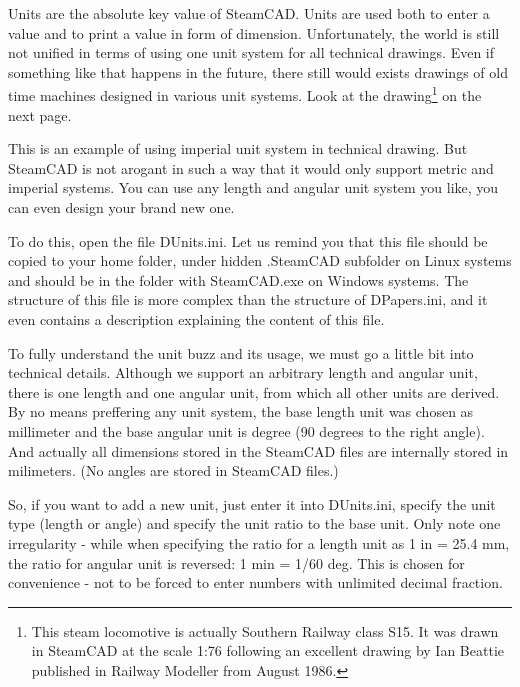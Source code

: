 Units are the absolute key value of SteamCAD. Units are used both to enter a value and
to print a value in form of dimension. Unfortunately, the world is still not unified
in terms of using one unit system for all technical drawings. Even if something like
that happens in the future, there still would exists drawings of old time machines
designed in various unit systems. Look at the drawing\footnote{This steam locomotive
is actually Southern Railway class S15. It was drawn in SteamCAD at the scale 1:76
following an excellent drawing by Ian Beattie published in Railway Modeller from August
1986.} on the next page.

This is an example of using imperial unit system in technical drawing. But SteamCAD
is not arogant in such a way that it would only support metric and imperial systems.
You can use any length and angular unit system you like, you can even design your
brand new one.

To do this, open the file DUnits.ini. Let us remind you that this file should be copied
to your home folder, under hidden .SteamCAD subfolder on Linux systems and should
be in the folder with SteamCAD.exe on Windows systems. The structure of this file
is more complex than the structure of DPapers.ini, and it even contains a description
explaining the content of this file.

\pagestyle{empty}
\begin{center}
\vspace*{-1.5cm}
\hspace*{-0.5cm}
\end{center}
\newpage

\pagestyle{headings}

To fully understand the unit buzz and its usage, we must go a little bit into technical
details. Although we support an arbitrary length and angular unit, there is one length
and one angular unit, from which all other units are derived. By no means preffering
any unit system, the base length unit was chosen as millimeter and the base angular
unit is degree (90 degrees to the right angle). And actually all dimensions stored in the
SteamCAD files are internally stored in milimeters. (No angles are stored in SteamCAD
files.)

So, if you want to add a new unit, just enter it into DUnits.ini, specify the unit
type (length or angle) and specify the unit ratio to the base unit. Only note one
irregularity - while when specifying the ratio for a length unit as 1 in = 25.4 mm,
the ratio for angular unit is reversed: 1 min = 1/60 deg. This is chosen for
convenience - not to be forced to enter numbers with unlimited decimal fraction.

